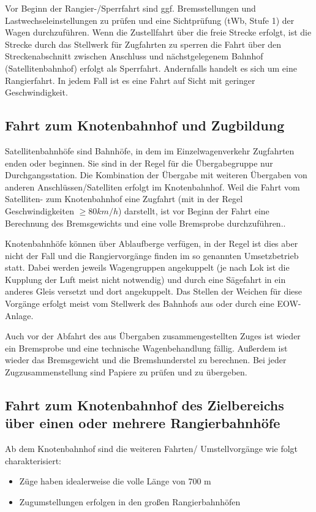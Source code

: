 Vor Beginn der Rangier-/Sperrfahrt sind ggf. Bremsstellungen und Lastwechseleinstellungen zu prüfen und eine Sichtprüfung (tWb, Stufe 1) der Wagen durchzuführen. Wenn die Zustellfahrt über die freie Strecke erfolgt, ist die Strecke durch das Stellwerk für Zugfahrten zu sperren die Fahrt über den Streckenabschnitt zwischen Anschluss und nächstgelegenem Bahnhof (Satellitenbahnhof) erfolgt als Sperrfahrt. Andernfalls handelt es sich um eine Rangierfahrt. In jedem Fall ist es eine Fahrt auf Sicht mit geringer Geschwindigkeit.

\subsection{Fahrt zum Knotenbahnhof und Zugbildung}

Satellitenbahnhöfe sind Bahnhöfe, in dem im Einzelwagenverkehr Zugfahrten enden oder beginnen. Sie sind in der Regel für die Übergabegruppe nur Durchgangsstation. Die Kombination der Übergabe mit weiteren Übergaben von anderen Anschlüssen/Satelliten erfolgt im Knotenbahnhof. Weil die Fahrt vom Satelliten- zum Knotenbahnhof eine Zugfahrt (mit in der Regel Geschwindigkeiten $\ge 80 km/h$) darstellt, ist vor Beginn der Fahrt eine Berechnung des Bremsgewichts und eine volle Bremsprobe durchzuführen..

Knotenbahnhöfe können über Ablaufberge verfügen, in der Regel ist dies aber nicht der Fall und die Rangiervorgänge finden im so genannten Umsetzbetrieb statt. Dabei werden jeweils Wagengruppen angekuppelt (je nach Lok ist die Kupplung der Luft meist nicht notwendig) und durch eine Sägefahrt in ein anderes Gleis versetzt und dort angekuppelt. Das Stellen der Weichen für diese Vorgänge erfolgt meist vom Stellwerk des Bahnhofs aus oder durch eine EOW-Anlage.

Auch vor der Abfahrt des aus Übergaben zusammengestellten Zuges ist wieder ein Bremsprobe und eine technische Wagenbehandlung fällig. Außerdem ist wieder das Bremsgewicht und die Bremshunderstel zu berechnen. Bei jeder Zugzusammenstellung sind Papiere zu prüfen und zu übergeben.

\subsection{Fahrt zum Knotenbahnhof des Zielbereichs über einen oder mehrere Rangierbahnhöfe}
Ab dem Knotenbahnhof sind die weiteren Fahrten/ Umstellvorgänge wie folgt charakterisiert:
\begin{itemize}
    \item Züge haben idealerweise die volle Länge von 700 m
    \item Zugumstellungen erfolgen in den großen Rangierbahnhöfen
\end{itemize}


